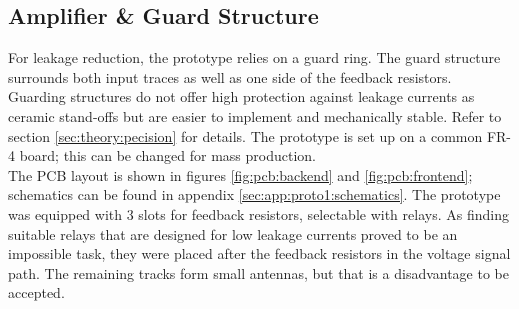 \subsection*{Amplifier \& Guard Structure}
For leakage reduction, the prototype relies on a guard ring. The guard structure surrounds both input traces as well as one side of the feedback resistors. Guarding structures do not offer high protection against leakage currents as ceramic stand-offs but are easier to implement and mechanically stable. Refer to section \ref{sec:theory:pecision} for details. The prototype is set up on a common \ac{FR-4} board; this can be changed for mass production. \\
The PCB layout is shown in figures \ref{fig:pcb:backend} and \ref{fig:pcb:frontend}; schematics can be found in appendix \ref{sec:app:proto1:schematics}.
The prototype was equipped with 3 slots for feedback resistors, selectable with relays. As finding suitable relays that are designed for low leakage currents proved to be an impossible task, they were placed after the feedback resistors in the voltage signal path. The remaining tracks form small antennas, but that is a disadvantage to be accepted.\\

